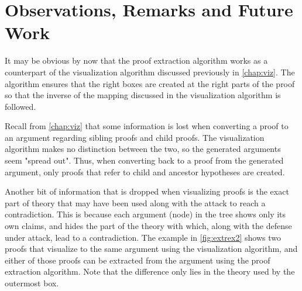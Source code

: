 \documentclass[11pt,twoside,a4paper]{report}
\begin{document}
\section{Observations, Remarks and Future Work}
It may be obvious by now that the proof extraction algorithm works as a counterpart of the visualization algorithm discussed previously in \autoref{chap:viz}. The algorithm ensures that the right boxes are created at the right parts of the proof so that the inverse of the mapping discussed in the visualization algorithm is followed.

Recall from \autoref{chap:viz} that some information is lost when converting a proof to an argument regarding sibling proofs and child proofs. The visualization algorithm makes no distinction between the two, so the generated arguments seem "spread out". Thus, when converting back to a proof from the generated argument, only proofs that refer to child and ancestor hypotheses are created. 

Another bit of information that is dropped when visualizing proofs is the exact part of theory that may have been used along with the attack to reach a contradiction. This is because each argument (node) in the tree shows only its own claims, and hides the part of the theory with which, along with the defense under attack, lead to a contradiction. The example in \autoref{fig:extrex2} shows two proofs that visualize to the same argument using the visualization algorithm, and either of those proofs can be extracted from the argument using the proof extraction algorithm. Note that the difference only lies in the theory used by the outermost box.
\end{document}
